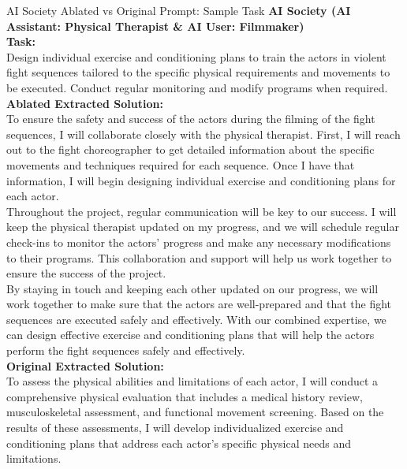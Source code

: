 \begin{AIBoxBreak}{AI Society Ablated vs Original Prompt: Sample Task}
	\textbf{AI Society (AI Assistant: Physical Therapist \& AI User: Filmmaker)}\\
	\textbf{Task:}\\
	Design individual exercise and conditioning plans to train the actors in violent fight sequences tailored to the specific physical requirements and movements to be executed. Conduct regular monitoring and modify programs when required.\\

	\textbf{Ablated Extracted Solution:}\\
	To ensure the safety and success of the actors during the filming of the fight sequences, I will collaborate closely with the physical therapist. First, I will reach out to the fight choreographer to get detailed information about the specific movements and techniques required for each sequence. Once I have that information, I will begin designing individual exercise and conditioning plans for each actor.\\

	Throughout the project, regular communication will be key to our success. I will keep the physical therapist updated on my progress, and we will schedule regular check-ins to monitor the actors' progress and make any necessary modifications to their programs. This collaboration and support will help us work together to ensure the success of the project.\\

	By staying in touch and keeping each other updated on our progress, we will work together to make sure that the actors are well-prepared and that the fight sequences are executed safely and effectively. With our combined expertise, we can design effective exercise and conditioning plans that will help the actors perform the fight sequences safely and effectively.
	\\

	\textbf{Original Extracted Solution:}\\
	To assess the physical abilities and limitations of each actor, I will conduct a comprehensive physical evaluation that includes a medical history review, musculoskeletal assessment, and functional movement screening. Based on the results of these assessments, I will develop individualized exercise and conditioning plans that address each actor's specific physical needs and limitations.\\


\end{AIBoxBreak}
